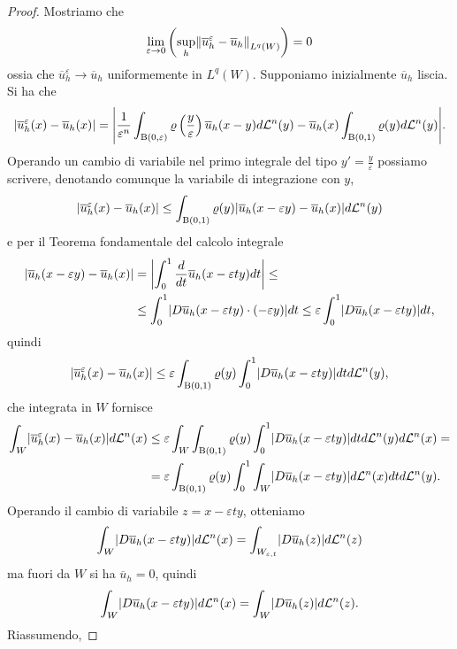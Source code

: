 \begin{proof}
	Mostriamo che 
	\[ \lim\limits_{\varepsilon \to 0} \left(\underset{h}{\textup{sup}}\norm*{\overline{u}_h^\varepsilon -\overline{u}_h}_{L^q(W)} \right) = 0  \]
	ossia che $\overline{u}_h^\varepsilon \to \overline{u}_h$ uniformemente in $L^q(W)$. Supponiamo inizialmente $\overline{u}_h$ liscia. Si ha che
	\[ \abs{\overline{u}_h^\varepsilon(x) - \overline{u}_h(x)} = \abs*{\frac{1}{\varepsilon^n} \int_{\textup{B}(0,\varepsilon)} \varrho\left( \frac{y}{\varepsilon}\right) \overline{u}_h(x-y) d\mathcal{L}^n(y) - \overline{u}_h(x)\int_{\textup{B}(0,1)}\varrho(y)d\mathcal{L}^n(y)}. \]
	Operando un cambio di variabile nel primo integrale del tipo $y' = \frac{y}{\varepsilon}$ possiamo scrivere, denotando comunque la variabile di integrazione con $y$, 
	\[ 	\abs{\overline{u}_h^\varepsilon(x) - \overline{u}_h(x)} \le \int_{\textup{B}(0,1)}\varrho(y)\abs*{\overline{u}_h(x-\varepsilon y) - \overline{u}_h(x)}d\mathcal{L}^n(y)\]
	e per il Teorema fondamentale del calcolo integrale
	\begin{align*}
		\abs*{\overline{u}_h(x-\varepsilon y) - \overline{u}_h(x)} &= \abs*{ \int_{0}^{1} \frac{d}{dt}\overline{u}_h(x-\varepsilon t y)dt} \le \\
		& \le \int_{0}^{1} \abs{D\overline{u}_h(x-\varepsilon t y) \cdot (-\varepsilon y)}dt \le \varepsilon \int_{0}^{1} \abs{D\overline{u}_h(x-\varepsilon t y)}dt,
	\end{align*}
	quindi
	\[ \abs{\overline{u}_h^\varepsilon(x) - \overline{u}_h(x)} \le \varepsilon \int_{\textup{B}(0,1)} \varrho(y) \int_{0}^{1} \abs{D\overline{u}_h(x-\varepsilon t y)}dt d\mathcal{L}^n(y), \]
	che integrata in $W$ fornisce
	\begin{align*}
		\int_W \abs{\overline{u}_h^\varepsilon(x) - \overline{u}_h(x)} d\mathcal{L}^n(x) &\le \varepsilon \int_W \int_{\textup{B}(0,1)} \varrho(y) \int_{0}^{1} \abs{D\overline{u}_h(x-\varepsilon t y)}dt d\mathcal{L}^n(y)d\mathcal{L}^n(x) = \\
		&= \varepsilon \int_{\textup{B}(0,1)} \varrho(y) \int_{0}^{1} \int_W \abs{D\overline{u}_h(x-\varepsilon t y)} d\mathcal{L}^n(x) dt d\mathcal{L}^n(y).
	\end{align*}
	Operando il cambio di variabile $z = x - \varepsilon t y$, otteniamo 
	\[ \int_W \abs{D\overline{u}_h(x-\varepsilon t y)} d\mathcal{L}^n(x) = \int_{W_{\varepsilon,t}} \abs{D\overline{u}_h(z)}d\mathcal{L}^n(z) \]
	ma fuori da $W$ si ha $\overline{u}_h = 0$, quindi 
	\[ \int_W \abs{D\overline{u}_h(x-\varepsilon t y)} d\mathcal{L}^n(x) = \int_{W} \abs{D\overline{u}_h(z)}d\mathcal{L}^n(z). \]
	Riassumendo,

\end{proof}
